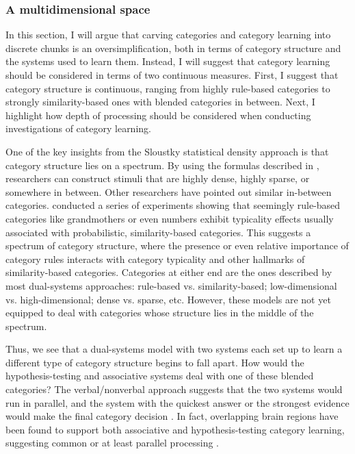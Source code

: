 \documentclass[../dissertation.tex]{subfiles}
\begin{document}
\subsubsection{A multidimensional space}
	In this section, I will argue that carving categories and category learning into discrete chunks is an oversimplification, both in terms of category structure and the systems used to learn them. Instead, I will suggest that category learning should be considered in terms of two continuous measures. First, I suggest that category structure is continuous, ranging from highly rule-based categories to strongly similarity-based ones with blended categories in between. Next, I highlight how depth of processing should be considered when conducting investigations of category learning. \par
	One of the key insights from the Sloustky statistical density approach is that category structure lies on a spectrum. By using the formulas described in \citet{Sloutsky2010}, researchers can construct stimuli that are highly dense, highly sparse, or somewhere in between. Other researchers have pointed out similar in-between categories. \citet{Lupyan2013a} conducted a series of experiments showing that seemingly rule-based categories like grandmothers or even numbers exhibit typicality effects usually associated with probabilistic, similarity-based categories. This suggests a spectrum of category structure, where the presence or even relative importance of category rules interacts with category typicality and other hallmarks of similarity-based categories. Categories at either end are the ones described by most dual-systems approaches: rule-based vs. similarity-based; low-dimensional vs. high-dimensional; dense vs. sparse, etc. However, these models are not yet equipped to deal with categories whose structure lies in the middle of the spectrum.  \par 
	Thus, we see that a dual-systems model with two systems each set up to learn a different type of category structure begins to fall apart. How would the hypothesis-testing and associative systems deal with one of these blended categories?  The verbal/nonverbal approach suggests that the two systems would run in parallel, and the system with the quickest answer or the strongest evidence would make the final category decision \citep{Minda2010}. In fact, overlapping brain regions have been found to support both associative and hypothesis-testing category learning, suggesting common or at least parallel processing \citep{Carpenter2016}. \par 
\end{document}
